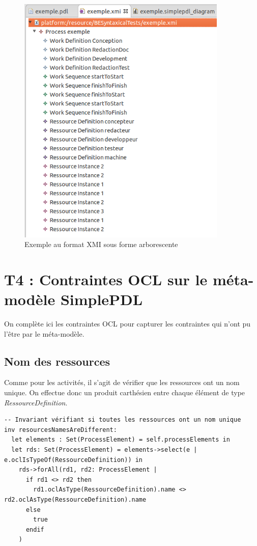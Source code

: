 \documentclass{report}
\begin{document}
\begin{figure}[!h] 
\begin{center}
\includegraphics[width=10cm]{Capture-12.png}
\caption{Exemple au format XMI sous forme arborescente} 
\label{img1} 
\end{center}
\end{figure} 

\newpage

\section{T4 : Contraintes OCL sur le méta-modèle SimplePDL}

On complète ici les contraintes OCL pour capturer les contraintes qui n’ont pu l’être par le méta-modèle.

\subsection{Nom des ressources}

Comme pour les activités, il s'agit de vérifier que les ressources ont un nom unique.
On effectue donc un produit carthésien entre chaque élément de type \textit{RessourceDefinition}.\\

\begin{verbatim}
-- Invariant vérifiant si toutes les ressources ont un nom unique
inv resourcesNamesAreDifferent:
  let elements : Set(ProcessElement) = self.processElements in
  let rds: Set(ProcessElement) = elements->select(e | e.oclIsTypeOf(RessourceDefinition)) in
    rds->forAll(rd1, rd2: ProcessElement |
      if rd1 <> rd2 then
        rd1.oclAsType(RessourceDefinition).name <> rd2.oclAsType(RessourceDefinition).name
      else
        true
      endif
    )
\end{verbatim}
\end{document}
